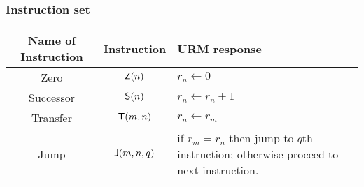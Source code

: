 \subsubsection*{Instruction set}
\begin{center}
	\begin{tabular}{|c|c|p{11cm}|}
	\hline 
	Name of  Instruction & Instruction & URM response \\
	\hline
	Zero & $\operatorname{\mathsf{Z}} (n)$ & $r_n \gets 0$ \\ 
	\hline
	Successor & $\operatorname{\mathsf{S}} (n)$ & $r_n \gets r_n + 1$ \\
	\hline
	Transfer & $\operatorname{\mathsf{T}} (m,n)$ & $r_n \gets r_m $ \\
	\hline
	Jump & $\operatorname{\mathsf{J}} (m,n,q)$ & if $r_m = r_n$ then jump to $q$th instruction; otherwise proceed to next instruction. \\
	\hline
\end{tabular}
\end{center}
